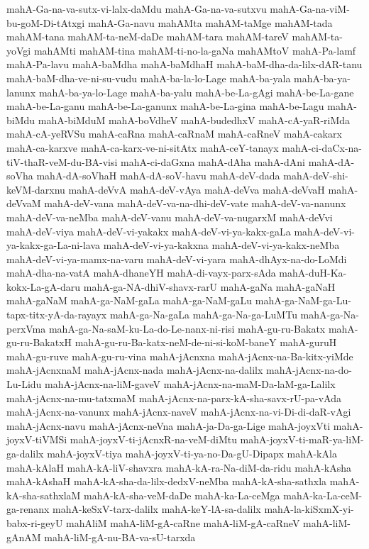 {mahA-Ga-na-va-sutx-vi-lalx-daMdu
mahA-Ga-na-va-sutxvu
mahA-Ga-na-viM-bu-goM-Di-tAtxgi
mahA-Ga-navu
mahAMta
mahAM-taMge
mahAM-tada
mahAM-tana
mahAM-ta-neM-daDe
mahAM-tara
mahAM-tareV
mahAM-ta-yoVgi
mahAMti
mahAM-tina
mahAM-ti-no-la-gaNa
mahAMtoV
mahA-Pa-lamf
mahA-Pa-lavu
mahA-baMdha
mahA-baMdhaH
mahA-baM-dha-da-lilx-dAR-tanu
mahA-baM-dha-ve-ni-su-vudu
mahA-ba-la-lo-Lage
mahA-ba-yala
mahA-ba-ya-lanunx
mahA-ba-ya-lo-Lage
mahA-ba-yalu
mahA-be-La-gAgi
mahA-be-La-gane
mahA-be-La-ganu
mahA-be-La-ganunx
mahA-be-La-gina
mahA-be-Lagu
mahA-biMdu
mahA-biMduM
mahA-boVdheV
mahA-budedhxV
mahA-cA-yaR-riMda
mahA-cA-yeRVSu
mahA-caRna
mahA-caRnaM
mahA-caRneV
mahA-cakarx
mahA-ca-karxve
mahA-ca-karx-ve-ni-sitAtx
mahA-ceY-tanayx
mahA-ci-daCx-na-tiV-thaR-veM-du-BA-visi
mahA-ci-daGxna
mahA-dAha
mahA-dAni
mahA-dA-soVha
mahA-dA-soVhaH
mahA-dA-soV-havu
mahA-deV-dada
mahA-deV-shi-keVM-darxnu
mahA-deVvA
mahA-deV-vAya
mahA-deVva
mahA-deVvaH
mahA-deVvaM
mahA-deV-vana
mahA-deV-va-na-dhi-deV-vate
mahA-deV-va-nanunx
mahA-deV-va-neMba
mahA-deV-vanu
mahA-deV-va-nugarxM
mahA-deVvi
mahA-deV-viya
mahA-deV-vi-yakakx
mahA-deV-vi-ya-kakx-gaLa
mahA-deV-vi-ya-kakx-ga-La-ni-lava
mahA-deV-vi-ya-kakxna
mahA-deV-vi-ya-kakx-neMba
mahA-deV-vi-ya-mamx-na-varu
mahA-deV-vi-yara
mahA-dhAyx-na-do-LoMdi
mahA-dha-na-vatA
mahA-dhaneYH
mahA-di-vayx-parx-sAda
mahA-duH-Ka-kokx-La-gA-daru
mahA-ga-NA-dhiV-shavx-rarU
mahA-gaNa
mahA-gaNaH
mahA-gaNaM
mahA-ga-NaM-gaLa
mahA-ga-NaM-gaLu
mahA-ga-NaM-ga-Lu-tapx-titx-yA-da-rayayx
mahA-ga-Na-gaLa
mahA-ga-Na-ga-LuMTu
mahA-ga-Na-perxVma
mahA-ga-Na-saM-ku-La-do-Le-nanx-ni-risi
mahA-gu-ru-Bakatx
mahA-gu-ru-BakatxH
mahA-gu-ru-Ba-katx-neM-de-ni-si-koM-baneY
mahA-guruH
mahA-gu-ruve
mahA-gu-ru-vina
mahA-jAcnxna
mahA-jAcnx-na-Ba-kitx-yiMde
mahA-jAcnxnaM
mahA-jAcnx-nada
mahA-jAcnx-na-dalilx
mahA-jAcnx-na-do-Lu-Lidu
mahA-jAcnx-na-liM-gaveV
mahA-jAcnx-na-maM-Da-laM-ga-Lalilx
mahA-jAcnx-na-mu-tatxmaM
mahA-jAcnx-na-parx-kA-sha-savx-rU-pa-vAda
mahA-jAcnx-na-vanunx
mahA-jAcnx-naveV
mahA-jAcnx-na-vi-Di-di-daR-vAgi
mahA-jAcnx-navu
mahA-jAcnx-neVna
mahA-ja-Da-ga-Lige
mahA-joyxVti
mahA-joyxV-tiVMSi
mahA-joyxV-ti-jAcnxR-na-veM-diMtu
mahA-joyxV-ti-maR-ya-liM-ga-dalilx
mahA-joyxV-tiya
mahA-joyxV-ti-ya-no-Da-gU-Dipapx
mahA-kAla
mahA-kAlaH
mahA-kA-liV-shavxra
mahA-kA-ra-Na-diM-da-ridu
mahA-kAsha
mahA-kAshaH
mahA-kA-sha-da-lilx-dedxV-neMba
mahA-kA-sha-sathxla
mahA-kA-sha-sathxlaM
mahA-kA-sha-veM-daDe
mahA-ka-La-ceMga
mahA-ka-La-ceM-ga-renanx
mahA-keSxV-tarx-dalilx
mahA-keY-lA-sa-dalilx
mahA-la-kiSxmX-yi-babx-ri-geyU
mahAliM
mahA-liM-gA-caRne
mahA-liM-gA-caRneV
mahA-liM-gAnAM
mahA-liM-gA-nu-BA-va-sU-tarxda
}
